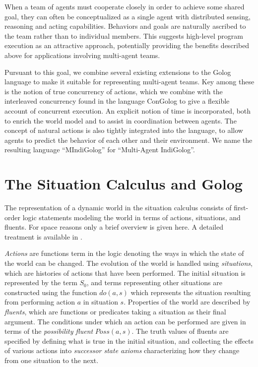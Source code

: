 \documentclass[letterpaper]{article}
\begin{document}
When a team of agents must cooperate closely in order to achieve some
shared goal, they can often be conceptualized as a single agent with
distributed sensing, reasoning and acting capabilities. Behaviors
and goals are naturally ascribed to the team rather than to individual
members.
This suggests high-level program execution as an attractive
approach, potentially providing the benefits described above for applications
involving multi-agent teams.

Pursuant to this goal, we combine several existing extensions to the
Golog language to make it suitable for representing multi-agent teams.
Key among these is the notion of true concurrency of actions, which
we combine with the interleaved concurrency found in the language
ConGolog to give a flexible account of concurrent
execution. An explicit notion of time is incorporated, both to enrich
the world model and to assist in coordination between agents. The
concept of natural actions is also tightly
integrated into the language, to allow agents to predict the behavior
of each other and their environment. We name the resulting language
``MIndiGolog'' for ``Multi-Agent IndiGolog''.

\section{The Situation Calculus and Golog}

The representation of a dynamic world in the situation calculus consists
of first-order logic statements modeling the world in terms of actions,
situations, and fluents.
For space reasons only a brief overview is given here.
A detailed treatment
is available in \cite{pirri99contributions_sitcalc}.

\emph{Actions} are functions term in the logic denoting the ways
in which the state of the world can be changed.
The evolution of the world is handled using \emph{situations}, which
are histories of actions that have been performed. The initial situation
is represented by the term $S_{0}$, and terms representing other situations
are constructed using the function $do(a,s)$ which represents the
situation resulting from performing action $a$ in situation $s$.
Properties of the world are described by \emph{fluents}, which are
functions or predicates taking a situation as their final argument.
The conditions under which an action can be performed are given in
terms of the \emph{possibility fluent} $Poss(a,s)$. The truth values
of fluents are specified by defining what is true in the initial situation,
and collecting the effects of various actions into \emph{successor
state axioms} characterizing how they change from one situation to
the next.
\end{document}
